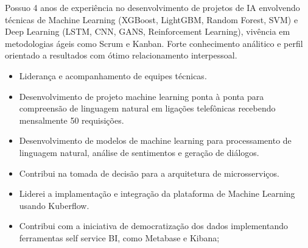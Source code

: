 \documentclass[10pt,a4paper,ragged2e]{altacv}
\begin{document}

\begin{fullwidth}
\makecvheader
\end{fullwidth}




Possuo 4 anos de experiência no desenvolvimento de projetos de IA envolvendo 
técnicas de Machine Learning (XGBoost, LightGBM, Random Forest, SVM) 
e Deep Learning  (LSTM, CNN, GANS, Reinforcement Learning), 
vivência em metodologias ágeis como Scrum e Kanban. 
Forte conhecimento análitico e perfil orientado a resultados com ótimo relacionamento 
interpessoal. 


\begin{itemize}

\item Liderança e acompanhamento de equipes técnicas.

\item Desenvolvimento de projeto machine learning ponta à ponta para compreensão de
      linguagem natural em ligações telefônicas recebendo mensalmente 50 requisições.

\item Desenvolvimento de modelos de machine learning para processamento de 
      linguagem natural, análise de sentimentos e geração de diálogos.

\item Contribui na tomada de decisão para a arquitetura de microsserviços.

\item Liderei a implamentação e integração da plataforma de Machine Learning usando 
      Kuberflow.
       
\item Contribui com a iniciativa de democratização dos dados implementando ferramentas
      self service BI, como Metabase e Kibana;

%
\end{itemize}
\end{document}
